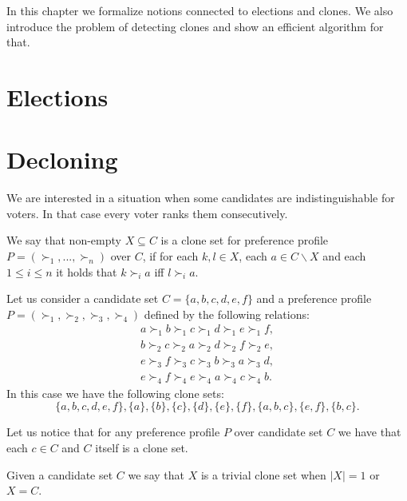 In this chapter we formalize notions connected to elections and clones.
We also introduce the problem of detecting clones and show an efficient algorithm for that.

\section{Elections} 

\section{Decloning}

We are interested in a situation when some candidates are indistinguishable for voters.
In that case every voter ranks them consecutively.

\begin{defn}
We say that non-empty $X \subseteq C$ is a clone set for preference profile $P = (\succ_1, ... , \succ_n)$ over $C$,
if for each $k,l \in X$, each $a \in C \backslash X$ and each $1 \leq i \leq n $ it holds that
$k \succ_i a$ iff $l \succ_i a$.
\end{defn}

\begin{exmp} \label{clone-sets}
Let us consider a candidate set $C = \{a,b,c,d,e,f\}$
and a preference profile $P = (\succ_1, \succ_2, \succ_3, \succ_4)$ defined by the following relations:
\begin{align*}
a \succ_1 b \succ_1 c \succ_1 d \succ_1 e \succ_1 f, \\
b \succ_2 c \succ_2 a \succ_2 d \succ_2 f \succ_2 e, \\
e \succ_3 f \succ_3 c \succ_3 b \succ_3 a \succ_3 d, \\
e \succ_4 f \succ_4 e \succ_4 a \succ_4 c \succ_4 b.
\end{align*}
In this case we have the following clone sets:
$$\{a,b,c,d,e,f\}, \{a\}, \{b\}, \{c\}, \{d\}, \{e\}, \{f\}, \{a,b,c\}, \{e,f\}, \{b,c\}.$$
\end{exmp}

\begin{rmrk}
Let us notice that for any preference profile $P$ over candidate set $C$
we have that each $c \in C$ and $C$ itself is a clone set.
\end{rmrk}

\begin{defn}
Given a candidate set $C$ we say that $X$ is a trivial clone set
when $\left\vert{X}\right\vert = 1$ or $X = C$.
\end{defn}

